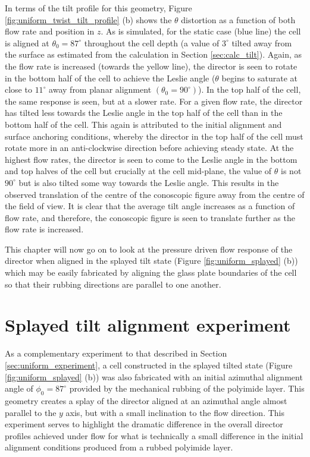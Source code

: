 In terms of the tilt profile for this geometry, Figure \ref{fig:uniform_twist_tilt_profile} (b) shows the $\theta$ distortion as a function of both flow rate and position in $z$. As is simulated, for the static case (blue line) the cell is aligned at $\theta_0=87^{\circ}$ throughout the cell depth (a value of $3^{\circ}$ tilted away from the surface as estimated from the calculation in Section \ref{sec:calc_tilt}). Again, as the flow rate is increased (towards the yellow line), the director is seen to rotate in the bottom half of the cell to achieve the Leslie angle ($\theta$ begins to saturate at close to $11^{\circ}$ away from planar alignment $\left(\theta_0=90^{\circ}\right)$). In the top half of the cell, the same response is seen, but at a slower rate. For a given flow rate, the director has tilted less towards the Leslie angle in the top half of the cell than in the bottom half of the cell. This again is attributed to the initial alignment and surface anchoring conditions, whereby the director in the top half of the cell must rotate more in an anti-clockwise direction before achieving steady state. At the highest flow rates, the director is seen to come to the Leslie angle in the bottom and top halves of the cell but crucially at the cell mid-plane, the value of $\theta$ is not $90^{\circ}$ but is also tilted some way towards the Leslie angle. This results in the observed translation of the centre of the conoscopic figure away from the centre of the field of view. It is clear that the average tilt angle increases as a function of flow rate, and therefore, the conoscopic figure is seen to translate further as the flow rate is increased.

This chapter will now go on to look at the pressure driven flow response of the director when aligned in the splayed tilt state (Figure \ref{fig:uniform_splayed} (b)) which may be easily fabricated by aligning the glass plate boundaries of the cell so that their rubbing directions are parallel to one another.

\section{Splayed tilt alignment experiment}
\label{sec:splayed}
As a complementary experiment to that described in Section \ref{sec:uniform_experiment}, a cell constructed in the splayed tilted state (Figure \ref{fig:uniform_splayed} (b)) was also fabricated with an initial azimuthal alignment angle of $\phi_0=87^{\circ}$ provided by the mechanical rubbing of the polyimide layer. This geometry creates a splay of the director aligned at an azimuthal angle almost parallel to the $y$ axis, but with a small inclination to the flow direction. This experiment serves to highlight the dramatic difference in the overall director profiles achieved under flow for what is technically a small difference in the initial alignment conditions produced from a rubbed polyimide layer.


